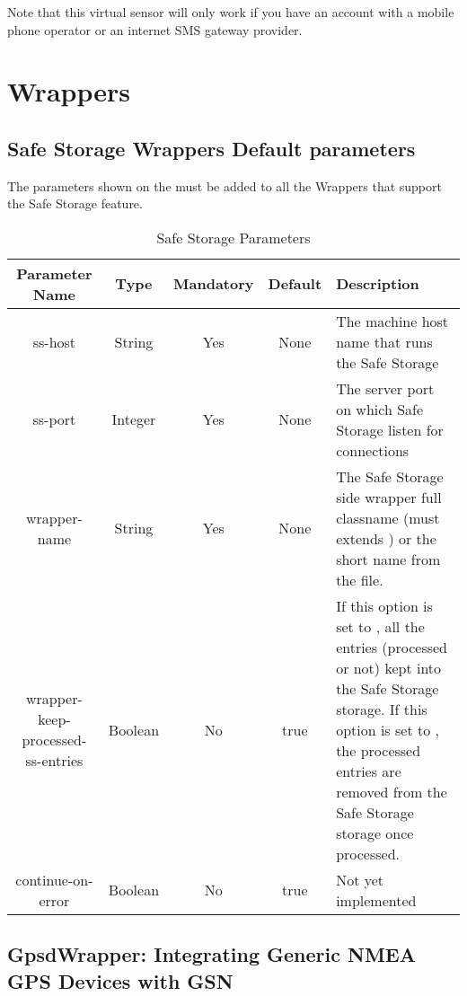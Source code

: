 Note that this virtual sensor will only work if you have an account with a mobile phone operator or an internet SMS gateway provider. 

\section{Wrappers}

\subsection{Safe Storage Wrappers Default parameters}

The parameters shown on the  must be added to all the Wrappers that support the 
Safe Storage feature.

\begin{table*}[!htp]
	\centering
	{\normalfont\footnotesize
	\begin{tabulary}{\textwidth}{|C|C|C|C|J|}%
	\hline
		\textbf{Parameter Name} &
		\textbf{Type} &
		\textbf{Mandatory} &
		\textbf{Default} &
		\textbf{Description} \\
	\hline
	\hline
		ss-host &
		String &	
		Yes &
		None &
		The machine host name that runs the Safe Storage \\
	\hline
		ss-port &
		Integer &	
		Yes &
		None &
		The server port on which Safe Storage listen for connections \\
	\hline
		wrapper-name &
		String &	
		Yes &
		None &
		The Safe Storage side wrapper full classname (must extends ) 
		or the short name from the  file. \\
	\hline
		wrapper-keep-processed-ss-entries &
		Boolean &
		No &
		true &
		If this option is set to , all the entries (processed or not) kept into the Safe Storage storage.
		If this option is set to , the processed entries are removed from the Safe Storage storage once processed. \\
	\hline
		continue-on-error &
		Boolean &	
		No &
		true &
		Not yet implemented \\
	\hline
	\end{tabulary}
	}
	\caption{Safe Storage Parameters}
	\label{table:safe_storage_parameters}
\end{table*}

\subsection{GpsdWrapper: Integrating Generic NMEA GPS Devices with GSN}

